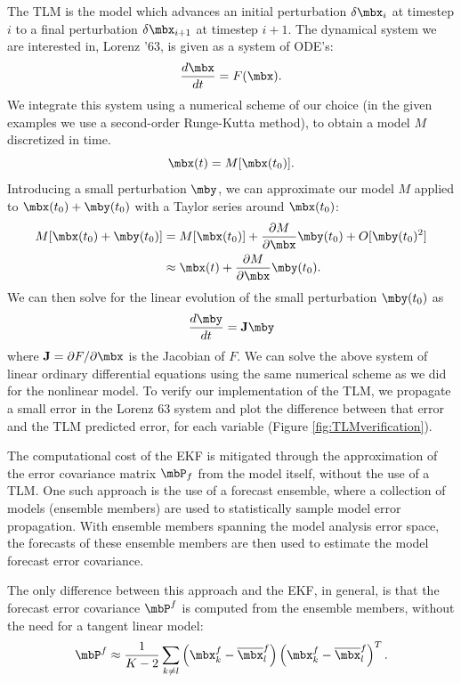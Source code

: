 The TLM is the model which advances an initial perturbation $\delta \mbx_{i}$ at timestep $i$ to a final perturbation $\delta \mbx_{i+1}$ at timestep $i+1$.
The dynamical system we are interested in, Lorenz '63, is given as a system of ODE's:
\[ \frac{d\mbx}{dt} = F(\mbx) .\]
We integrate this system using a numerical scheme of our choice (in the given examples we use a second-order Runge-Kutta method), to obtain a model $M$ discretized in time.
\[ \mbx(t) = M[ \mbx(t_0) ] .\]
Introducing a small perturbation $\mby$, we can approximate our model $M$ applied to $\mbx(t_0) + \mby(t_0)$ with a Taylor series around $\mbx(t_0)$:
\begin{align*} M[ \mbx(t_0) + \mby(t_0) ] &= M [ \mbx(t_0) ] + \frac{\partial M}{\partial \mbx} \mby(t_0) + O [ \mby(t_0) ^2 ]\\ &\approx \mbx(t) + \frac{\partial M}{\partial \mbx} \mby(t_0) .\end{align*}
We can then solve for the linear evolution of the small perturbation $\mby(t_0)$ as 
\begin{equation} \frac{d\mby }{dt } = \mathbf{J} \mby \label{eq:ODETLM} \end{equation}
where $\mathbf{J} = \partial F / \partial \mbx$ is the Jacobian of $F$.
We can solve the above system of linear ordinary differential equations using the same numerical scheme as we did for the nonlinear model.
To verify our implementation of the TLM, we propagate a small error in the Lorenz 63 system and plot the difference between that error and the TLM predicted error, for each variable (Figure \ref{fig:TLMverification}).



The computational cost of the EKF is mitigated through the approximation of the error covariance matrix $\mbP_f$ from the model itself, without the use of a TLM.
One such approach is the use of a forecast ensemble, where a collection of models (ensemble members) are used to statistically sample model error propagation.
With ensemble members spanning the model analysis error space, the forecasts of these ensemble members are then used to estimate the model forecast error covariance.

The only difference between this approach and the EKF, in general, is that the forecast error covariance $\mbP^f$ is computed from the ensemble members, without the need for a tangent linear model:
\[ \mbP^f \approx \frac{1}{K-2} \sum _{k\neq l} \left ( \mbx_k ^f - \overline{\mbx} ^f _l \right ) \left (\mbx_k ^f - \overline{\mbx} ^f _l \right ) ^T .\]

